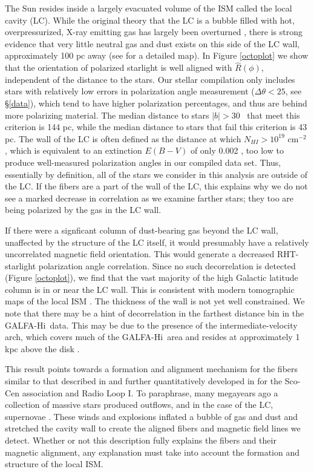 \documentclass[12pt]{emulateapj}
\newcommand{\hi}{H{\sc i}~}
\newcommand{\citei}[1]{\citeauthor{#1} \citeyear{#1}}
\begin{document}
The Sun resides inside a largely evacuated volume of the ISM called the local cavity (LC). While the original theory that the LC is a bubble filled with hot, overpressurized, X-ray emitting gas has largely been overturned \citep{Koutroumpa09,WS10,2011ApJ...735..129P}, there is strong evidence that very little neutral gas and dust exists on this side of the LC wall, approximately 100 pc away (see \citei{2013arXiv1309.6100L} for a detailed map). In Figure \ref{octoplot} we show that the orientation of polarized starlight is well aligned with $\hat{R}\left(\phi\right)$, independent of the distance to the stars. Our stellar compilation only includes stars with relatively low errors in polarization angle measurement ($\Delta \theta < 25$\degree, see \S \ref{data}), which tend to have higher polarization percentages, and thus are behind more polarizing material. The median distance to stars $|b| > 30$\degree~ that meet this criterion is 144 pc, while the median distance to stars that fail this criterion is 43 pc. The wall of the LC is often defined as the distance at which $N_{HI} > 10^{19}$ cm$^{-2}$ \citep{CR87}, which is equivalent to an extinction $E\left(B-V\right)$ of only 0.002 \citep{2013ApJ...766L...6P}, too low to produce well-measured polarization angles in our compiled data set. Thus, essentially by definition, all of the stars we consider in this analysis are outside of the LC. If the fibers are a part of the wall of the LC, this explains why we do not see a marked decrease in correlation as we examine farther stars; they too are being polarized by the gas in the LC wall.

If there were a signficant column of dust-bearing gas beyond the LC wall, unaffected by the structure of the LC itself, it would presumably have a relatively uncorrelated magnetic field orientation. This would generate a decreased RHT-starlight polarization angle correlation. Since no such decorrelation is detected (Figure \ref{octoplot}), we find that the vast majority of the high Galactic latitude column is in or near the LC wall. This is consistent with modern tomographic maps of the local ISM \citep{Vergely10, 2013arXiv1309.6100L}. The thickness of the wall is not yet well constrained. We note that there may be a hint of decorrelation in the farthest distance bin in the GALFA-\hi data. This may be due to the presence of the intermediate-velocity arch, which covers much of the GALFA-\hi area and resides at approximately 1 kpc above the disk \citep{Kuntz:1996ff}.

This result points towards a formation and alignment mechanism for the fibers similar to that described in \citet{Weaver:1979vh} and further quantitatively developed in \citet{1998LNP...506..227H} for the Sco-Cen association and Radio Loop I. To paraphrase, many megayears ago a collection of massive stars produced outflows, and in the case of the LC, supernovae \citep{CR87}. These winds and explosions inflated a bubble of gas and dust and stretched the cavity wall to create the aligned fibers and magnetic field lines we detect. Whether or not this description fully explains the fibers and their magnetic alignment, any explanation must take into account the formation and structure of the local ISM.
\end{document}

